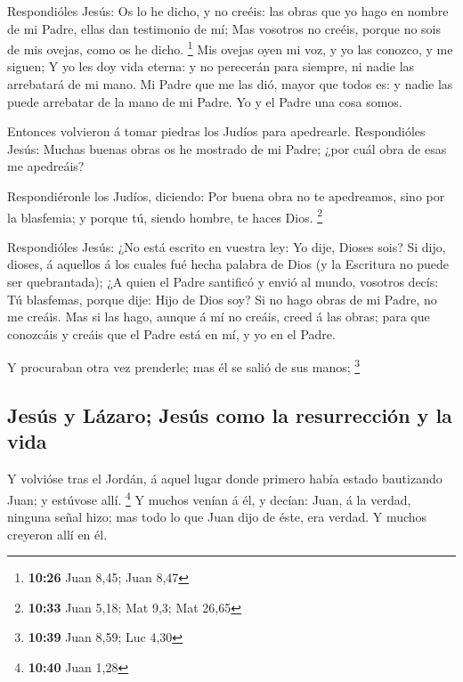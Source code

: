  Respondióles Jesús: Os lo he dicho, y no creéis: las
obras que yo hago en nombre de mi Padre, ellas dan testimonio de mí;
 Mas vosotros no creéis, porque no sois de mis ovejas,
como os he dicho. \footnote{\textbf{10:26} Juan 8,45; Juan 8,47}
 Mis ovejas oyen mi voz, y yo las conozco, y me siguen;
 Y yo les doy vida eterna: y no perecerán para siempre,
ni nadie las arrebatará de mi mano.  Mi Padre que me las
dió, mayor que todos es: y nadie las puede arrebatar de la mano de mi
Padre.  Yo y el Padre una cosa somos.

 Entonces volvieron á tomar piedras los Judíos para
apedrearle.  Respondióles Jesús: Muchas buenas obras os
he mostrado de mi Padre; ¿por cuál obra de esas me apedreáis?

 Respondiéronle los Judíos, diciendo: Por buena obra no
te apedreamos, sino por la blasfemia; y porque tú, siendo hombre, te
haces Dios. \footnote{\textbf{10:33} Juan 5,18; Mat 9,3; Mat 26,65}

 Respondióles Jesús: ¿No está escrito en vuestra ley: Yo
dije, Dioses sois?  Si dijo, dioses, á aquellos á los
cuales fué hecha palabra de Dios (y la Escritura no puede ser
quebrantada);  ¿A quien el Padre santificó y envió al
mundo, vosotros decís: Tú blasfemas, porque dije: Hijo de Dios soy?
 Si no hago obras de mi Padre, no me creáis.
 Mas si las hago, aunque á mí no creáis, creed á las
obras; para que conozcáis y creáis que el Padre está en mí, y yo en el
Padre.

 Y procuraban otra vez prenderle; mas él se salió de sus
manos; \footnote{\textbf{10:39} Juan 8,59; Luc 4,30}

\hypertarget{jesuxfas-y-luxe1zaro-jesuxfas-como-la-resurrecciuxf3n-y-la-vida}{%
\subsection{Jesús y Lázaro; Jesús como la resurrección y la
vida}\label{jesuxfas-y-luxe1zaro-jesuxfas-como-la-resurrecciuxf3n-y-la-vida}}

 Y volvióse tras el Jordán, á aquel lugar donde primero
había estado bautizando Juan; y estúvose allí. \footnote{\textbf{10:40}
  Juan 1,28}  Y muchos venían á él, y decían: Juan, á la
verdad, ninguna señal hizo; mas todo lo que Juan dijo de éste, era
verdad.  Y muchos creyeron allí en él.

